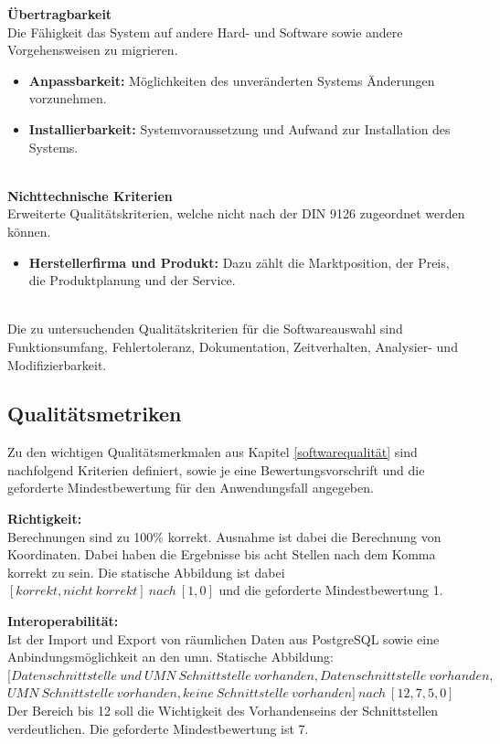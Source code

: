 \newpage
\textbf{Übertragbarkeit}\\
Die Fähigkeit das System auf andere Hard- und Software sowie andere Vorgehensweisen zu migrieren.
\begin{itemize}
\item \textbf{Anpassbarkeit:} Möglichkeiten des unveränderten Systems Änderungen vorzunehmen.
\item \textbf{Installierbarkeit:} Systemvoraussetzung und Aufwand zur Installation des Systems.
\end{itemize}
\ \\
%
\textbf{Nichttechnische Kriterien}\\
Erweiterte Qualitätskriterien, welche nicht nach der DIN 9126 zugeordnet werden können.
\begin{itemize}
\item \textbf{Herstellerfirma und Produkt:} Dazu zählt die Marktposition, der Preis, die Produktplanung und der Service.
\end{itemize}
\ \\
%
Die zu untersuchenden Qualitätskriterien für die Softwareauswahl sind Funktionsumfang, Fehlertoleranz, Dokumentation, Zeitverhalten, Analysier- und Modifizierbarkeit.


\subsection{Qualitätsmetriken}
\label{qualitätsmetriken}
Zu den wichtigen Qualitätsmerkmalen aus Kapitel \ref{softwarequalität} sind nachfolgend Kriterien definiert, sowie je eine Bewertungsvorschrift und die geforderte Mindestbewertung für den Anwendungsfall angegeben.

\textbf{Richtigkeit:}\\
Berechnungen sind zu 100\% korrekt. Ausnahme ist dabei die Berechnung von Koordinaten. Dabei haben die Ergebnisse bis acht Stellen nach dem Komma korrekt zu sein.
Die statische Abbildung ist dabei $[korrekt, nicht\ korrekt]\ nach\ [1, 0]$ und die geforderte Mindestbewertung 1.

\textbf{Interoperabilität:}\\
Ist der Import und Export von räumlichen Daten aus PostgreSQL sowie eine Anbindungsmöglichkeit an den \Gls{umn}.
Statische Abbildung:\\
$[Datenschnittstelle\ und\ UMN\ Schnittstelle\ vorhanden,Datenschnittstelle\ vorhanden,$\\$UMN\ Schnittstelle\ vorhanden,keine\ Schnittstelle\ vorhanden]\ nach\ [12,7,5,0]$\\
Der Bereich bis 12 soll die Wichtigkeit des Vorhandenseins der Schnittstellen verdeutlichen.
Die geforderte Mindestbewertung ist 7.

